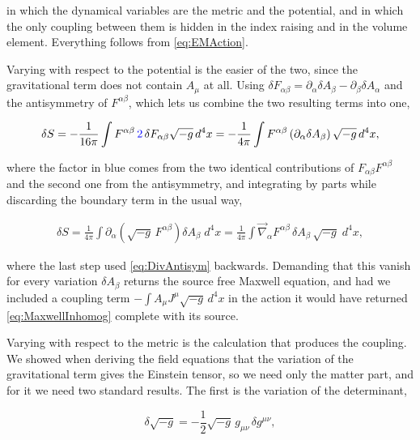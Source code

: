         in which the dynamical variables are the metric and the potential, and in which the only coupling between them is hidden in the index raising and in the volume element. Everything follows from \ref{eq:EMAction}.

        Varying with respect to the potential is the easier of the two, since the gravitational term does not contain $A_{\mu}$ at all. Using $\delta F_{\alpha\beta} = \partial_{\alpha}\delta A_{\beta} - \partial_{\beta}\delta A_{\alpha}$ and the antisymmetry of $F^{\alpha\beta}$, which lets us combine the two resulting terms into one,

        \begin{align*}
            \delta S = -\frac{1}{16\pi}\int F^{\alpha\beta}\,{\color{blue}2}\,\delta F_{\alpha\beta}\sqrt{-g}\,d^4x = -\frac{1}{4\pi}\int F^{\alpha\beta}\left(\partial_{\alpha}\delta A_{\beta}\right)\sqrt{-g}\,d^4x,
        \end{align*}

        where the factor in blue comes from the two identical contributions of $F_{\alpha\beta}F^{\alpha\beta}$ and the second one from the antisymmetry, and integrating by parts while discarding the boundary term in the usual way,

        \begin{align*}
            \delta S = \frac{1}{4\pi}\int \partial_{\alpha}\left(\sqrt{-g}\,F^{\alpha\beta}\right)\delta A_{\beta}\;d^4x = \frac{1}{4\pi}\int \Vec{\nabla}_{\alpha}F^{\alpha\beta}\,\delta A_{\beta}\,\sqrt{-g}\;d^4x,
        \end{align*}

        where the last step used \ref{eq:DivAntisym} backwards. Demanding that this vanish for every variation $\delta A_{\beta}$ returns the source free Maxwell equation, and had we included a coupling term $-\int A_{\mu}J^{\mu}\sqrt{-g}\,d^4x$ in the action it would have returned \ref{eq:MaxwellInhomog} complete with its source.

        Varying with respect to the metric is the calculation that produces the coupling. We showed when deriving the field equations that the variation of the gravitational term gives the Einstein tensor, so we need only the matter part, and for it we need two standard results. The first is the variation of the determinant,

        \begin{equation}\label{eq:VarDet}
            \delta\sqrt{-g} = -\frac{1}{2}\sqrt{-g}\,g_{\mu\nu}\,\delta g^{\mu\nu},
        \end{equation}

